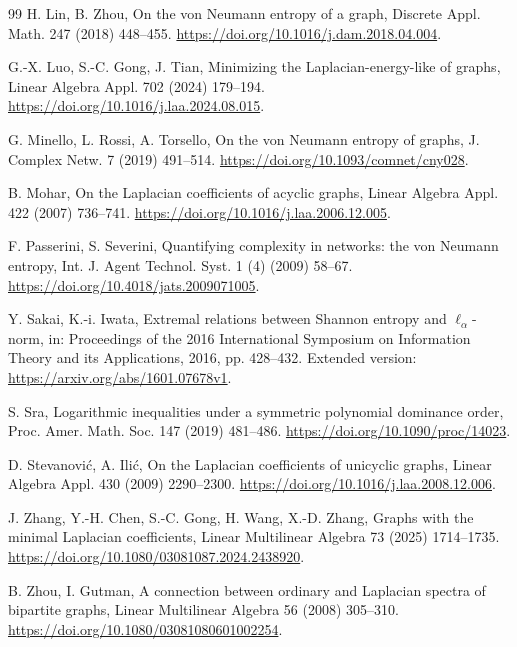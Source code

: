 \documentclass[11pt,a4paper,reqno]{amsart}
\theoremstyle{remark}
\numberwithin{equation}{section}
\begin{document}
\begin{thebibliography}{99}
H. Lin, B. Zhou, On the von Neumann entropy of a graph,
Discrete Appl. Math. 247 (2018) 448--455.
\url{https://doi.org/10.1016/j.dam.2018.04.004}.

G.-X. Luo, S.-C. Gong, J. Tian,
Minimizing the Laplacian-energy-like of graphs,
Linear Algebra Appl. 702 (2024) 179--194.
\url{https://doi.org/10.1016/j.laa.2024.08.015}.

G. Minello, L. Rossi, A. Torsello,
On the von Neumann entropy of graphs,
J. Complex Netw. 7 (2019) 491--514.
\url{https://doi.org/10.1093/comnet/cny028}.

B. Mohar, On the Laplacian coefficients of acyclic graphs,
Linear Algebra Appl. 422 (2007) 736--741.
\url{https://doi.org/10.1016/j.laa.2006.12.005}.

F. Passerini, S. Severini, Quantifying complexity in networks: the von Neumann entropy,
Int. J. Agent Technol. Syst. 1 (4) (2009) 58--67.
\url{https://doi.org/10.4018/jats.2009071005}.

Y. Sakai, K.-i. Iwata, Extremal relations between Shannon entropy and $\ell_\alpha$-norm,
in: Proceedings of the 2016 International Symposium on Information Theory and its Applications,
2016, pp. 428--432.
Extended version: \url{https://arxiv.org/abs/1601.07678v1}.

S. Sra, Logarithmic inequalities under a symmetric polynomial dominance order,
Proc. Amer. Math. Soc. 147 (2019) 481--486.
\url{https://doi.org/10.1090/proc/14023}.

D. Stevanovi\'c, A. Ili\'c, On the Laplacian coefficients of unicyclic graphs,
Linear Algebra Appl. 430 (2009) 2290--2300.
\url{https://doi.org/10.1016/j.laa.2008.12.006}.

J. Zhang, Y.-H. Chen, S.-C. Gong, H. Wang, X.-D. Zhang,
Graphs with the minimal Laplacian coefficients,
Linear Multilinear Algebra 73 (2025) 1714--1735.
\url{https://doi.org/10.1080/03081087.2024.2438920}.

B. Zhou, I. Gutman, A connection between ordinary and Laplacian spectra of bipartite graphs,
Linear Multilinear Algebra 56 (2008) 305--310.
\url{https://doi.org/10.1080/03081080601002254}.
\end{thebibliography}
\end{document}
